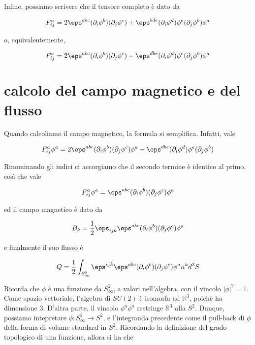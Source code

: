 \documentclass{report}
\begin{document}
Infine, possiamo scrivere che il tensore completo è dato da 

\begin{align}
    F^a_{ij} = 2\eps^{abc}(\partial_i \phi^b)(\partial_j \phi^c) + \eps^{bde}(\partial_i \phi^d)\phi^e (\partial_j \phi^b)\phi^a
\end{align}

o, equivalentemente, 

\begin{align}
    F^a_{ij} = 2\eps^{abc}(\partial_i \phi^b)(\partial_j \phi^c) - \eps^{dbe}(\partial_i \phi^d)\phi^e (\partial_j \phi^b)\phi^a
\end{align}

\section{calcolo del campo magnetico e del flusso}

Quando calcoliamo il campo magnetico, la formula si semplifica. Infatti, vale 

\begin{align}
    F^a_{ij}\phi^a =  2\eps^{abc}(\partial_i \phi^b)(\partial_j \phi^c)\phi^a - \eps^{dbe}(\partial_i \phi^d)\phi^e (\partial_j \phi^b)
\end{align}

Rinominando gli indici ci accorgiamo che il secondo termine è identico al primo, così che vale 

\begin{align}
     F^a_{ij}\phi^a =  \eps^{abc}(\partial_i \phi^b)(\partial_j \phi^c)\phi^a
\end{align}

ed il campo magnetico è dato da 

\begin{align}
    B_k = \frac{1}{2}\eps_{ijk}\eps^{abc}(\partial_i \phi^b)(\partial_j \phi^c)\phi^a
\end{align}

e finalmente il suo flusso è 

\begin{align}
    Q = \frac{1}{2}\int_{S^2_{\infty}} \eps^{ijk}\eps^{abc}(\partial_i \phi^b)(\partial_j \phi^c)\phi^a n^k d^2S
\end{align}

Ricorda che \(\phi\) è una funzione da \(S^2_\infty\), a valori nell'algebra, con il vincolo \(|\phi|^2 = 1\). Come spazio vettoriale, l'algebra di \(SU(2)\) è isomorfa ad \(\mathbb{R}^3\), poichè ha dimensione 3. D'altra parte, il vincolo \(\phi^a\phi^a\) restringe \(\mathbb{R}^3\) alla \(S^2\). Dunque, possiamo intepretare \(\phi: S^2_{\infty} \rightarrow S^2\), e l'integranda precedente come il pull-back di \(\phi\) della forma di volume standard in \(S^2\). Ricordando la definizione del grado topologico di una funzione, allora si ha che 
\end{document}
